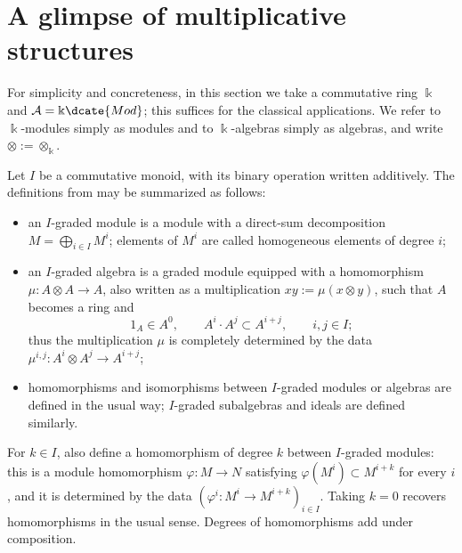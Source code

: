 
\section{A glimpse of multiplicative structures}\label{sec:multiplicative-SS}
\hypertarget{o014.aljabr2.chapter5.multiplicative-structures}{ }

For simplicity and concreteness, in this section we take a commutative ring
$\Bbbk$ and $\mathcal{A}=\Bbbk\dcate{Mod}$; this suffices for the classical
applications. We refer to $\Bbbk$-modules simply as modules and to
$\Bbbk$-algebras simply as algebras, and write
$\otimes:=\otimes_{\Bbbk}$.

Let $I$ be a commutative monoid, with its binary operation written additively.
The definitions from \cite[\S 7.4]{Li1} may be summarized as follows:
\begin{itemize}
	\item an $I$-graded module is a module with a direct-sum decomposition
	$M=\bigoplus_{i\in I}M^i$; elements of $M^i$ are called homogeneous
	elements of degree $i$;
	\item an $I$-graded algebra is a graded module equipped with a homomorphism
	$\mu:A\otimes A\to A$, also written as a multiplication
	$xy:=\mu(x\otimes y)$, such that $A$ becomes a ring and
	\[ 1_A\in A^0,\qquad A^i\cdot A^j\subset A^{i+j},
	\qquad i,j\in I; \]
	thus the multiplication $\mu$ is completely determined by the data
	$\mu^{i,j}:A^i\otimes A^j\to A^{i+j}$;
	\item homomorphisms and isomorphisms between $I$-graded modules or algebras
	are defined in the usual way; $I$-graded subalgebras and ideals are defined
	similarly.
\end{itemize}

For $k\in I$, also define a homomorphism of degree $k$ between $I$-graded
modules: this is a module homomorphism $\varphi:M\to N$ satisfying
$\varphi(M^i)\subset M^{i+k}$ for every $i$, and it is determined by the data
$(\varphi^i:M^i\to M^{i+k})_{i\in I}$. Taking $k=0$ recovers homomorphisms in
the usual sense. Degrees of homomorphisms add under composition.

